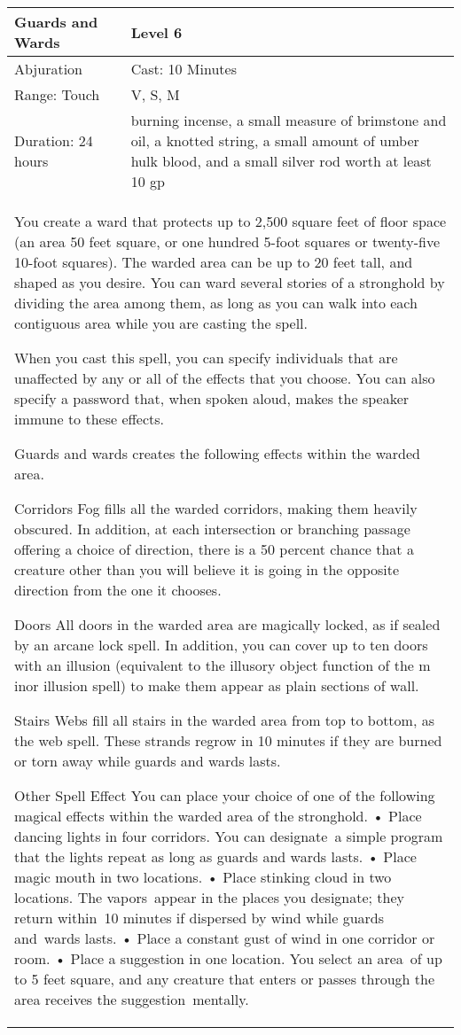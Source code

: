 \documentclass[11pt]{report}
\begin{document}
\begin{table}[H]
	\begin{tabular}{||p{6cm}|p{6cm}||}
		\hline\hline
		\bf{Guards and Wards} & Level 6\\ \hline
		Abjuration & Cast: 10 Minutes\\ \hline
		Range: Touch & V, S, M\\ \hline
		Duration: 24 hours & burning incense, a small measure of brimstone and oil, a knotted string, a small amount of umber hulk blood, and a small silver rod worth at least 10 gp\\ \hline
		\multicolumn{2}{||p{12cm}||}{You create a ward that protects up to 2,500 square feet of floor space (an area 50 feet square, or one hundred 5-foot squares or twenty-five 10-foot squares). The warded area can be up to 20 feet tall, and shaped as you desire. You can ward several stories of a stronghold by dividing the area among them, as long as you can walk into each contiguous area while you are casting the spell.

When you cast this spell, you can specify individuals that are unaffected by any or all of the effects that you choose. You can also specify a password that, when spoken aloud, makes the speaker immune to these effects.

Guards and wards creates the following effects within the warded area.

Corridors
Fog fills all the warded corridors, making them heavily obscured. In addition, at each intersection or branching passage offering a choice of direction, there is a 50 percent chance that a creature other than you will believe it is going in the opposite direction from the one it chooses.

Doors
All doors in the warded area are magically locked, as if sealed by an arcane lock spell. In addition, you can cover up to ten doors with an illusion (equivalent to the illusory object function of the m inor illusion spell) to make them appear as plain sections of wall.

Stairs
Webs fill all stairs in the warded area from top to bottom, as the web spell. These strands regrow in 10 minutes if they are burned or torn away while guards and wards lasts.

Other Spell Effect
You can place your choice of one of the following magical effects within the warded area of the stronghold.
• Place dancing lights in four corridors. You can designate a simple program that the lights repeat as long as
guards and wards lasts.
• Place magic mouth in two locations.
• Place stinking cloud in two locations. The vapors appear in the places you designate; they return within 10 minutes if dispersed by wind while guards and wards lasts.
• Place a constant gust of wind in one corridor or room.
• Place a suggestion in one location. You select an area of up to 5 feet square, and any creature that enters
or passes through the area receives the suggestion mentally.

}
\end{tabular}
\end{table}
\end{document}
